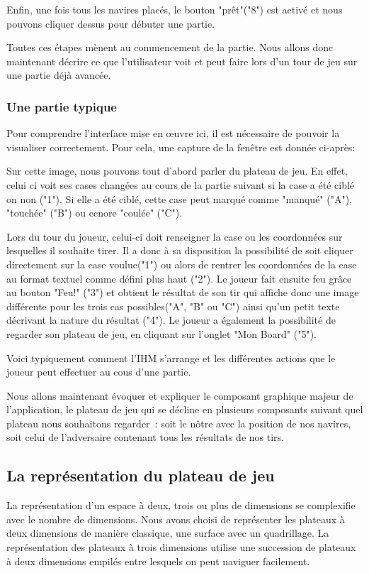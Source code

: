 	Enfin, une fois tous les navires placés, le bouton "prêt"("8") est activé et nous pouvons cliquer dessus pour débuter une partie.
	\newline
	
	Toutes ces étapes mènent au commencement de la partie. Nous allons donc maintenant décrire ce que l'utilisateur voit et peut faire lors d'un tour de jeu sur une partie déjà avancée.
	
	\subsubsection{Une partie typique}
	Pour comprendre l'interface mise en œuvre ici, il est nécessaire de pouvoir la visualiser correctement. Pour cela, une capture de la fenêtre est donnée ci-après:\newline

	Sur cette image, nous pouvons tout d'abord parler du plateau de jeu. En effet, celui ci voit ses cases changées au cours de la partie suivant si la case a été ciblé on non ("1"). Si elle a été ciblé, cette case peut marqué comme "manqué" ("A"), "touchée" ("B") ou ecnore "coulée" ("C").
	\newline
	
	Lors du tour du joueur, celui-ci doit renseigner la case ou les coordonnées sur lesquelles il souhaite tirer. Il a donc à sa disposition la possibilité de soit cliquer directement sur la case voulue("1") ou alors de rentrer les coordonnées de la case au format textuel comme défini plus haut ("2"). Le joueur fait ensuite feu grâce au bouton "Feu!" ("3") et obtient le résultat de son tir qui affiche donc une image différente pour les trois cas possibles("A", "B" ou "C") ainsi qu'un petit texte décrivant la nature du résultat ("4"). Le joueur a également la possibilité de regarder son plateau de jeu, en cliquant sur l'onglet "Mon Board" ("5").
\newline

	Voici typiquement comment l'IHM s'arrange et les différentes actions que le joueur peut effectuer au cous d'une partie. 
	 \newline
	  
	Nous allons maintenant évoquer et expliquer le composant graphique majeur de l'application, le plateau de jeu qui se décline en plusieurs composants suivant quel plateau nous souhaitons regarder~: soit le nôtre avec la position de nos navires, soit celui de l'adversaire contenant tous les résultats de nos tirs.

\subsection{La représentation du plateau de jeu}
	La représentation d'un espace à deux, trois ou plus de dimensions se complexifie avec le nombre de dimensions.
Nous avons choisi de représenter les plateaux à deux dimensions de manière classique, une surface avec un quadrillage. La représentation des plateaux à trois dimensions utilise une succession de plateaux à deux dimensions empilés entre lesquels on peut naviguer facilement. \newline

